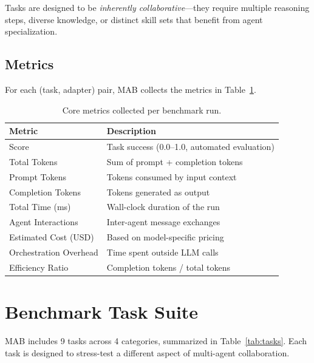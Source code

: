\documentclass[sigconf,nonacm]{acmart}
\begin{document}
Tasks are designed to be \emph{inherently collaborative}—they require multiple reasoning steps, diverse knowledge, or distinct skill sets that benefit from agent specialization.

\subsection{Metrics}

For each (task, adapter) pair, MAB collects the metrics in Table~\ref{tab:metrics}.

\begin{table}[t]
\centering
\caption{Core metrics collected per benchmark run.}
\label{tab:metrics}
\small
\begin{tabular}{@{}ll@{}}
\toprule
\textbf{Metric} & \textbf{Description} \\
\midrule
Score & Task success (0.0--1.0, automated evaluation) \\
Total Tokens & Sum of prompt + completion tokens \\
Prompt Tokens & Tokens consumed by input context \\
Completion Tokens & Tokens generated as output \\
Total Time (ms) & Wall-clock duration of the run \\
Agent Interactions & Inter-agent message exchanges \\
Estimated Cost (USD) & Based on model-specific pricing \\
Orchestration Overhead & Time spent outside LLM calls \\
Efficiency Ratio & Completion tokens / total tokens \\
\bottomrule
\end{tabular}
\end{table}

\section{Benchmark Task Suite}
\label{sec:tasks}

MAB includes 9 tasks across 4 categories, summarized in Table~\ref{tab:tasks}. Each task is designed to stress-test a different aspect of multi-agent collaboration.
\end{document}
